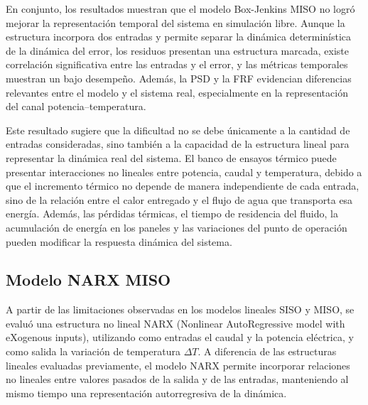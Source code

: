 \documentclass[11pt]{report}
\begin{document}
En conjunto, los resultados muestran que el modelo Box-Jenkins MISO no logró mejorar la representación temporal del sistema en simulación libre. Aunque la estructura incorpora dos entradas y permite separar la dinámica determinística de la dinámica del error, los residuos presentan una estructura marcada, existe correlación significativa entre las entradas y el error, y las métricas temporales muestran un bajo desempeño. Además, la PSD y la FRF evidencian diferencias relevantes entre el modelo y el sistema real, especialmente en la representación del canal potencia–temperatura.

Este resultado sugiere que la dificultad no se debe únicamente a la cantidad de entradas consideradas, sino también a la capacidad de la estructura lineal para representar la dinámica real del sistema. El banco de ensayos térmico puede presentar interacciones no lineales entre potencia, caudal y temperatura, debido a que el incremento térmico no depende de manera independiente de cada entrada, sino de la relación entre el calor entregado y el flujo de agua que transporta esa energía. Además, las pérdidas térmicas, el tiempo de residencia del fluido, la acumulación de energía en los paneles y las variaciones del punto de operación pueden modificar la respuesta dinámica del sistema.

\subsection{Modelo NARX MISO}


A partir de las limitaciones observadas en los modelos lineales SISO y MISO, se evaluó una estructura no lineal NARX (Nonlinear AutoRegressive model with eXogenous inputs), utilizando como entradas el caudal y la potencia eléctrica, y como salida la variación de temperatura $\Delta T$. A diferencia de las estructuras lineales evaluadas previamente, el modelo NARX permite incorporar relaciones no lineales entre valores pasados de la salida y de las entradas, manteniendo al mismo tiempo una representación autorregresiva de la dinámica.
\end{document}
